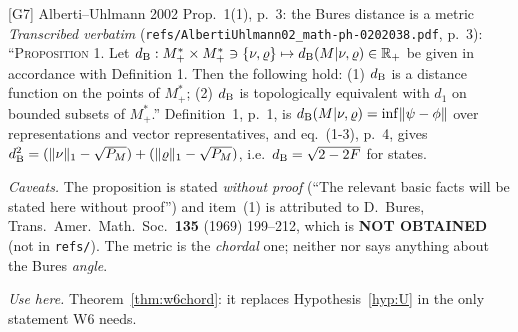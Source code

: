 \documentclass[11pt]{article}
\theoremstyle{definition}\newtheorem{example}[theorem]{Example}
\begin{document}
\begin{citedbox}{[G7] Alberti--Uhlmann 2002 Prop.~1(1), p.~3: the Bures distance is a metric}
\emph{Transcribed verbatim} (\texttt{refs/AlbertiUhlmann02\_math-ph-0202038.pdf}, p.~3):
``\textsc{Proposition 1}.  Let $d_{\rm B}:M^*_+\times M^*_+\ni\{\nu,\varrho\}\mapsto
d_{\rm B}(M|\nu,\varrho)\in\mathbb R_+$ be given in accordance with Definition 1.  Then the
following hold: (1) $d_{\rm B}$ is a distance function on the points of $M^*_+$; (2)
$d_{\rm B}$ is topologically equivalent with $d_1$ on bounded subsets of $M^*_+$.''  Definition~1,
p.~1, is $d_{\rm B}(M|\nu,\varrho)=\inf\lVert\psi-\phi\rVert$ over representations and vector
representatives, and eq.~(1-3), p.~4, gives
$d_{\rm B}^2=(\lVert\nu\rVert_1-\sqrt{P_M})+(\lVert\varrho\rVert_1-\sqrt{P_M})$, i.e.\
$d_{\rm B}=\sqrt{2-2F}$ for states.

\emph{Caveats.}  The proposition is stated \emph{without proof} (``The relevant basic facts will
be stated here without proof'') and item~(1) is attributed to D.~Bures, Trans.\ Amer.\ Math.\
Soc.\ \textbf{135} (1969) 199--212, which is \textbf{NOT OBTAINED} (not in \texttt{refs/}).  The
metric is the \emph{chordal} one; neither \cite{AU02} nor \cite{Uhl76} says anything about the
Bures \emph{angle}.

\emph{Use here.}  Theorem~\ref{thm:w6chord}: it replaces Hypothesis~\ref{hyp:U} in the only
statement W6 needs.

\smallskip\noindent{}
\end{citedbox}
\end{document}
